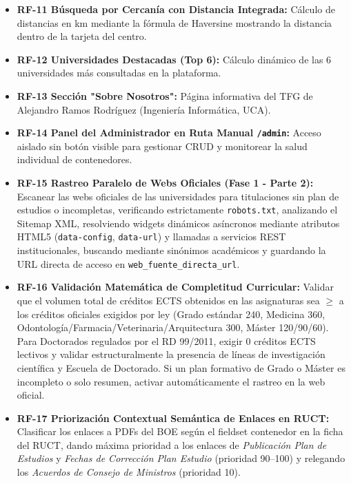 \begin{itemize}
    \item \textbf{RF-11 Búsqueda por Cercanía con Distancia Integrada:} Cálculo de distancias en km mediante la fórmula de Haversine mostrando la distancia dentro de la tarjeta del centro.
    \item \textbf{RF-12 Universidades Destacadas (Top 6):} Cálculo dinámico de las 6 universidades más consultadas en la plataforma.
    \item \textbf{RF-13 Sección "Sobre Nosotros":} Página informativa del TFG de Alejandro Ramos Rodríguez (Ingeniería Informática, UCA).
    \item \textbf{RF-14 Panel del Administrador en Ruta Manual \texttt{/admin}:} Acceso aislado sin botón visible para gestionar CRUD y monitorear la salud individual de contenedores.
    \item \textbf{RF-15 Rastreo Paralelo de Webs Oficiales (Fase 1 - Parte 2):} Escanear las webs oficiales de las universidades para titulaciones sin plan de estudios o incompletas, verificando estrictamente \texttt{robots.txt}, analizando el Sitemap XML, resolviendo widgets dinámicos asíncronos mediante atributos HTML5 (\texttt{data-config}, \texttt{data-url}) y llamadas a servicios REST institucionales, buscando mediante sinónimos académicos y guardando la URL directa de acceso en \texttt{web\_fuente\_directa\_url}.
    \item \textbf{RF-16 Validación Matemática de Completitud Curricular:} Validar que el volumen total de créditos ECTS obtenidos en las asignaturas sea $\ge$ a los créditos oficiales exigidos por ley (Grado estándar 240, Medicina 360, Odontología/Farmacia/Veterinaria/Arquitectura 300, Máster 120/90/60). Para Doctorados regulados por el RD 99/2011, exigir 0 créditos ECTS lectivos y validar estructuralmente la presencia de líneas de investigación científica y Escuela de Doctorado. Si un plan formativo de Grado o Máster es incompleto o solo resumen, activar automáticamente el rastreo en la web oficial.
    \item \textbf{RF-17 Priorización Contextual Semántica de Enlaces en RUCT:} Clasificar los enlaces a PDFs del BOE según el fieldset contenedor en la ficha del RUCT, dando máxima prioridad a los enlaces de \emph{Publicación Plan de Estudios} y \emph{Fechas de Corrección Plan Estudio} (prioridad 90--100) y relegando los \emph{Acuerdos de Consejo de Ministros} (prioridad 10).
\end{itemize}

